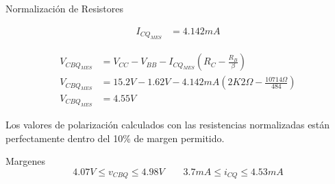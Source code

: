 \begin{frame}[allowframebreaks]{Normalización de Resistores}
\begin{figure}[!ht]
\begin{minipage}{0.45\textwidth}
\begin{align*}
        I_{CQ_{MES}} &= 4.142mA
      \end{align*}
    \end{minipage}
    \hfill
    \begin{minipage}{0.45\textwidth}
      \begin{align*}
        V_{CBQ_{MES}} &= V_{CC} - V_{BB} - I_{CQ_{MES}} \left(R_C - \frac{R_B}{\beta}\right)\\[6pt]
        V_{CBQ_{MES}} &= 15.2V - 1.62V - 4.142mA \left(2K2\Omega - \frac{10714\Omega}{484}\right)\\[6pt]
        V_{CBQ_{MES}} &= 4.55V
      \end{align*}
    \end{minipage}
  \end{figure}

  Los valores de polarización calculados con las resistencias normalizadas están perfectamente dentro del 10\% de margen
  permitido.
  \begin{block}{Margenes}
    \begin{equation*}
      4.07V \leq v_{CBQ} \leq 4.98V \quad \quad 3.7mA \leq i_{CQ} \leq 4.53mA
    \end{equation*}
  \end{block}


\end{frame}
